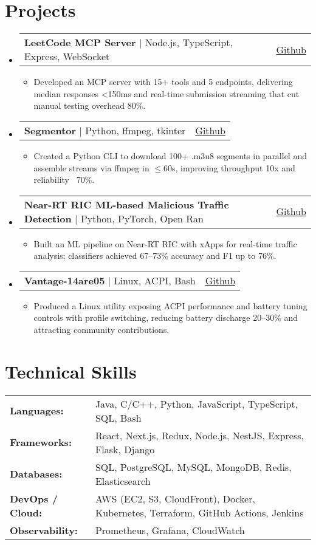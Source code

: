 \documentclass[a4paper,11pt]{article}
\makeatletter
\newcommand{\resumeItem}[1]{
    \item\small{
        {#1 \vspace{-4pt}}
    }
}
\newcommand{\resumeProjectHeading}[3]{
    \item
    \begin{tabular*}{0.97\textwidth}{l@{\extracolsep{\fill}}r}
      \small\textbf{#1} $|$ #2 & #3 \\
    \end{tabular*}\vspace{-7pt}
}
\newcommand{\resumeSubHeadingListStart}{\begin{itemize}[leftmargin=5pt, label={}]}
\newcommand{\resumeSubHeadingListEnd}{\end{itemize}}
\newcommand{\resumeItemListStart}{\begin{itemize}[leftmargin=10pt]}
\newcommand{\resumeItemListEnd}{\end{itemize}\vspace{-5pt}}
\makeatother
\begin{document}
\section{Projects}
\resumeSubHeadingListStart
\resumeProjectHeading
{LeetCode MCP Server}{Node.js, TypeScript, Express, WebSocket}{\href{https://github.com/ayushjaipuriyar/leetcode-mcpserver}{Github}}
\resumeItemListStart
\resumeItem{Developed an MCP server with 15+ tools and 5 endpoints, delivering median responses <150ms and real-time submission streaming that cut manual testing overhead 80\%.}
\resumeItemListEnd

\resumeProjectHeading
{Segmentor}{Python, ffmpeg, tkinter}{\href{https://github.com/ayushjaipuriyar/animepahe-dl}{Github}}
\resumeItemListStart
\resumeItem{Created a Python CLI to download 100+ .m3u8 segments in parallel and assemble streams via ffmpeg in $\leq$60s, improving throughput 10x and reliability ~70\%.}
\resumeItemListEnd

\resumeProjectHeading
{Near-RT RIC ML-based Malicious Traffic Detection }{Python, PyTorch, Open Ran}{\href{https://github.com/ayushjaipuriyar/ric-xapps-malicious-detection}{Github}}
\resumeItemListStart
\resumeItem{Built an ML pipeline on Near-RT RIC with xApps for real-time traffic analysis; classifiers achieved 67--73\% accuracy and F1 up to 76\%.}
\resumeItemListEnd

\resumeProjectHeading
{Vantage-14are05 }{Linux, ACPI, Bash}{\href{https://github.com/ayushjaipuriyar/vantage-14are05}{Github}}
\resumeItemListStart
\resumeItem{Produced a Linux utility exposing ACPI performance and battery tuning controls with profile switching, reducing battery discharge 20--30\% and attracting community contributions.}
\resumeItemListEnd
\resumeSubHeadingListEnd

\section{Technical Skills}
\small
\begin{tabularx}{\textwidth}{@{}l X}
    \textbf{Languages:}      & Java, C/C++, Python, JavaScript, TypeScript, SQL, Bash                            \\
    \textbf{Frameworks:}     & React, Next.js, Redux, Node.js, NestJS, Express, Flask, Django                    \\
    \textbf{Databases:}      & SQL, PostgreSQL, MySQL, MongoDB, Redis, Elasticsearch                             \\
    \textbf{DevOps / Cloud:} & AWS (EC2, S3, CloudFront), Docker, Kubernetes, Terraform, GitHub Actions, Jenkins \\
    \textbf{Observability:}  & Prometheus, Grafana, CloudWatch                                                   \\
\end{tabularx}
\end{document}

